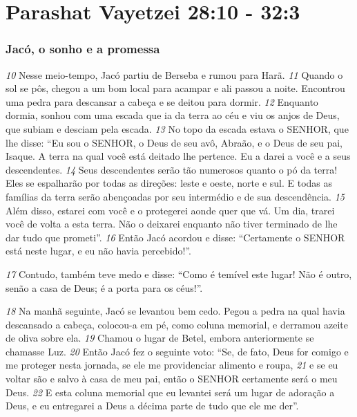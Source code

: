 \section*{Parashat Vayetzei 28:10 - 32:3}

\subsubsection*{Jacó, o sonho e a promessa}

\textit{\tiny 10}
Nesse meio-tempo, Jacó partiu de Berseba e rumou para Harã. 
\textit{\tiny 11}
Quando o sol
se pôs, chegou a um bom local para acampar e ali passou a noite. Encontrou uma
pedra para descansar a cabeça e se deitou para dormir. 
\textit{\tiny 12}
Enquanto dormia,
sonhou com uma escada que ia da terra ao céu e viu os anjos de Deus, que subiam
e desciam pela escada.
\textit{\tiny 13}
No topo da escada estava o SENHOR, que lhe disse: “Eu sou o SENHOR, o Deus de
seu avô, Abraão, e o Deus de seu pai, Isaque. A terra na qual você está deitado lhe
pertence. Eu a darei a você e a seus descendentes. 
\textit{\tiny 14}
Seus descendentes serão tão
numerosos quanto o pó da terra! Eles se espalharão por todas as direções: leste e
oeste, norte e sul. E todas as famílias da terra serão abençoadas por seu
intermédio e de sua descendência. 
\textit{\tiny 15}
Além disso, estarei com você e o protegerei
aonde quer que vá. Um dia, trarei você de volta a esta terra. Não o deixarei
enquanto não tiver terminado de lhe dar tudo que prometi”.
\textit{\tiny 16}
Então Jacó acordou e disse: “Certamente o SENHOR está neste lugar, e eu não
havia percebido!”. 

\bigskip
\textit{\tiny 17}
Contudo, também teve medo e disse: “Como é temível este
lugar! Não é outro, senão a casa de Deus; é a porta para os céus!”.

\bigskip
\textit{\tiny 18}
Na manhã seguinte, Jacó se levantou bem cedo. Pegou a pedra na qual havia
descansado a cabeça, colocou-a em pé, como coluna memorial, e derramou azeite
de oliva sobre ela. 
\textit{\tiny 19}
Chamou o lugar de Betel, embora anteriormente se
chamasse Luz.
\textit{\tiny 20}
Então Jacó fez o seguinte voto: “Se, de fato, Deus for comigo e me proteger
nesta jornada, se ele me providenciar alimento e roupa, 
\textit{\tiny 21}
e se eu voltar são e salvo
à casa de meu pai, então o SENHOR certamente será o meu Deus. 
\textit{\tiny 22}
E esta coluna
memorial que eu levantei será um lugar de adoração a Deus, e eu entregarei a
Deus a décima parte de tudo que ele me der”.

